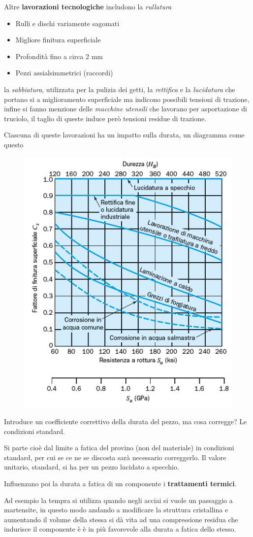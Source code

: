 			 Altre \textbf{lavorazioni tecnologiche} includono la \textit{rullatura}
			 \begin{itemize}
			 	\item Rulli e dischi variamente sagomati
			 	\item Migliore finitura superficiale
			 	\item Profondità fino a circa 2 mm
			 	\item Pezzi assialsimmetrici (raccordi)
			 \end{itemize}
		 	 la \textit{sabbiatura}, utilizzata per la pulizia dei getti, la \textit{rettifica} e la \textit{lucidatura} che portano si a miglioramento superficiale ma indicono possibili tensioni di trazione, infine si fanno menzione delle \textit{macchine utensili} che lavorano per asportazione di truciolo, il taglio di queste induce però tensioni residue di trazione.\newline 
		 	 
			 Ciascuna di queste lavorazioni ha un impatto sulla durata, un diagramma come questo
			 
			 \begin{figure}[H]
			 	\centering
			 	\includegraphics[width=0.35\linewidth]{immagini_10/screenshot023}
			 	\label{fig:screenshot023}
			 \end{figure}
			 
			Introduce un coefficiente correttivo della durata del pezzo, ma cosa corregge? Le condizioni standard.
			
		    Si parte cioè dal limite a fatica del provino (non del materiale) in condizioni standard, per cui se ce ne se discosta sarà necessario correggerlo.  
		    Il valore unitario, standard, si ha per un pezzo lucidato a specchio. \newline
			 
			Influenzano poi la durata a fatica di un componente i \textbf{trattamenti termici}. 
			
			Ad esempio la tempra si utilizza quando negli acciai si vuole un passaggio a martensite, in questo modo andando a modificare la struttura cristallina e aumentando il volume della stessa si dà vita ad una compressione residua che indurisce il componente è è in più favorevole alla durata a fatica dello stesso. 
			

